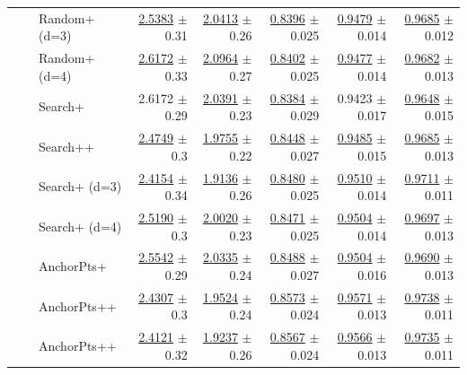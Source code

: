 \begin{longtable}{llp{}rrrrr}
 &  & Random+ (d=3) & \underline{2.5383} {\scriptsize $\pm$ 0.31} & \underline{2.0413} {\scriptsize $\pm$ 0.26} & \underline{0.8396} {\scriptsize $\pm$ 0.025} & \underline{0.9479} {\scriptsize $\pm$ 0.014} & \underline{0.9685} {\scriptsize $\pm$ 0.012} \\
 &  & Random+ (d=4) & \underline{2.6172} {\scriptsize $\pm$ 0.33} & \underline{2.0964} {\scriptsize $\pm$ 0.27} & \underline{0.8402} {\scriptsize $\pm$ 0.025} & \underline{0.9477} {\scriptsize $\pm$ 0.014} & \underline{0.9682} {\scriptsize $\pm$ 0.013} \\
 &  & Search+ & 2.6172 {\scriptsize $\pm$ 0.29} & \underline{2.0391} {\scriptsize $\pm$ 0.23} & \underline{0.8384} {\scriptsize $\pm$ 0.029} & 0.9423 {\scriptsize $\pm$ 0.017} & \underline{0.9648} {\scriptsize $\pm$ 0.015} \\
 &  & Search++ & \underline{2.4749} {\scriptsize $\pm$ 0.3} & \underline{1.9755} {\scriptsize $\pm$ 0.22} & \underline{0.8448} {\scriptsize $\pm$ 0.027} & \underline{0.9485} {\scriptsize $\pm$ 0.015} & \underline{0.9685} {\scriptsize $\pm$ 0.013} \\
 &  & Search+ (d=3) & \underline{2.4154} {\scriptsize $\pm$ 0.34} & \underline{1.9136} {\scriptsize $\pm$ 0.26} & \underline{0.8480} {\scriptsize $\pm$ 0.025} & \underline{0.9510} {\scriptsize $\pm$ 0.014} & \underline{0.9711} {\scriptsize $\pm$ 0.011} \\
 &  & Search+ (d=4) & \underline{2.5190} {\scriptsize $\pm$ 0.3} & \underline{2.0020} {\scriptsize $\pm$ 0.23} & \underline{0.8471} {\scriptsize $\pm$ 0.025} & \underline{0.9504} {\scriptsize $\pm$ 0.014} & \underline{0.9697} {\scriptsize $\pm$ 0.013} \\
 &  & AnchorPts+ & \underline{2.5542} {\scriptsize $\pm$ 0.29} & \underline{2.0335} {\scriptsize $\pm$ 0.24} & \underline{0.8488} {\scriptsize $\pm$ 0.027} & \underline{0.9504} {\scriptsize $\pm$ 0.016} & \underline{0.9690} {\scriptsize $\pm$ 0.013} \\
 &  & AnchorPts++ & \underline{2.4307} {\scriptsize $\pm$ 0.3} & \underline{1.9524} {\scriptsize $\pm$ 0.24} & \underline{0.8573} {\scriptsize $\pm$ 0.024} & \underline{0.9571} {\scriptsize $\pm$ 0.013} & \underline{0.9738} {\scriptsize $\pm$ 0.011} \\
 &  & AnchorPts++ & \underline{2.4121} {\scriptsize $\pm$ 0.32} & \underline{1.9237} {\scriptsize $\pm$ 0.26} & \underline{0.8567} {\scriptsize $\pm$ 0.024} & \underline{0.9566} {\scriptsize $\pm$ 0.013} & \underline{0.9735} {\scriptsize $\pm$ 0.011} \\

\end{longtable}
